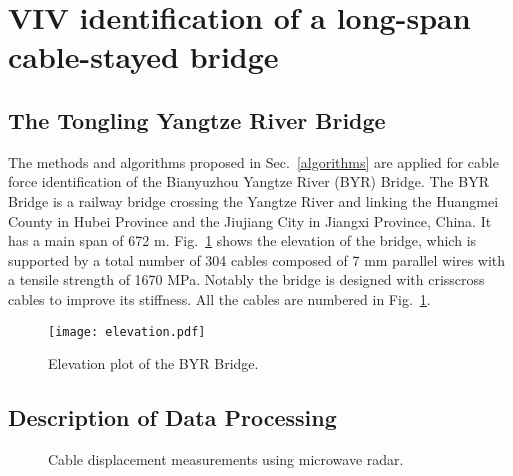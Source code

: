 \documentclass[preprint, 3p, times, compress, 11pt]{elsarticle}
\begin{document}
\section{VIV identification of a long-span cable-stayed bridge}
\label{sec:experiment}

\subsection{The Tongling Yangtze River Bridge}

The methods and algorithms proposed in Sec.~\ref{algorithms} are 
applied for cable force identification of the Bianyuzhou Yangtze River 
(BYR) Bridge. The BYR Bridge is a railway bridge crossing the Yangtze 
River and linking the Huangmei County in Hubei Province and the Jiujiang 
City in Jiangxi Province, China. It has a main span of 672 m. 
Fig.~\ref{elevation} shows the elevation of the bridge, which is 
supported by a total number of 304 cables composed of 7 mm parallel 
wires with a tensile strength of 1670 MPa. Notably the bridge is 
designed with crisscross cables to improve its stiffness. All the cables 
are numbered in Fig.~\ref{elevation}. 

\begin{figure}[ht]
    \centering
    \texttt{[image: elevation.pdf]}
    \caption{Elevation plot of the BYR Bridge.}
    \label{elevation}
\end{figure}

\subsection{Description of Data Processing}

\begin{figure}[ht]
    \centering
    \caption{Cable displacement measurements using microwave radar.}
    \label{radar-setup}
\end{figure}
\end{document}
